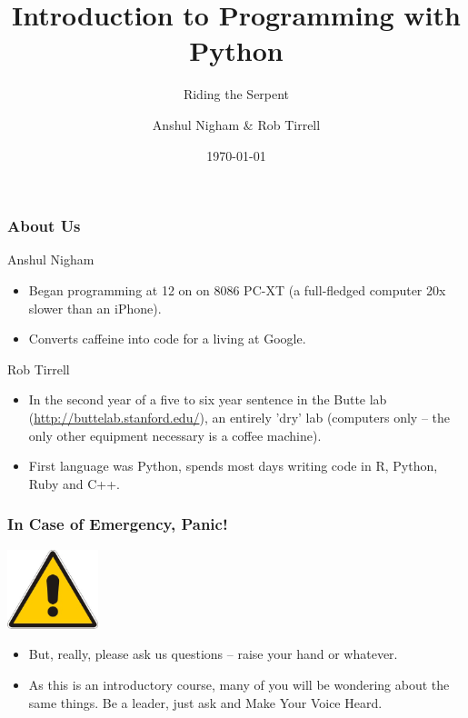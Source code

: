 \documentclass[10pt]{beamer}
\title{Introduction to Programming with Python}
\subtitle{Riding the Serpent}
\author{Anshul Nigham \& Rob Tirrell}
\date{\today}
\begin{document}
\begin{frame}
  \titlepage
\end{frame}

\begin{frame}[fragile]
  \frametitle{About Us}
  \begin{block}{Anshul Nigham}
    \begin{itemize}
      \item Began programming at 12 on on 8086 PC-XT (a full-fledged computer 20x slower than an iPhone).
      \item Converts caffeine into code for a living at Google.
    \end{itemize}
  \end{block}
  \begin{block}{Rob Tirrell}
    \begin{itemize}
      \item In the second year of a five to six year sentence in the Butte lab (\href{http://buttelab.stanford.edu/}{http://buttelab.stanford.edu/}), an entirely 'dry' lab (computers only -- the only other equipment necessary is a coffee machine).
      \item First language was Python, spends most days writing code in R, Python, Ruby and C++.
    \end{itemize}
  \end{block}
\end{frame}

\begin{frame}
  \frametitle{In Case of Emergency, Panic!}
  \begin{center}
    \includegraphics[width=100px]{AlertSign.jpg}
  \end{center}
  \begin{itemize}
    \item But, really, please ask us questions -- raise your hand or whatever.
    \item As this is an introductory course, many of you will be wondering about the same things.
      Be a leader, just ask and Make Your Voice Heard.
  \end{itemize}
\end{frame}
\end{document}
